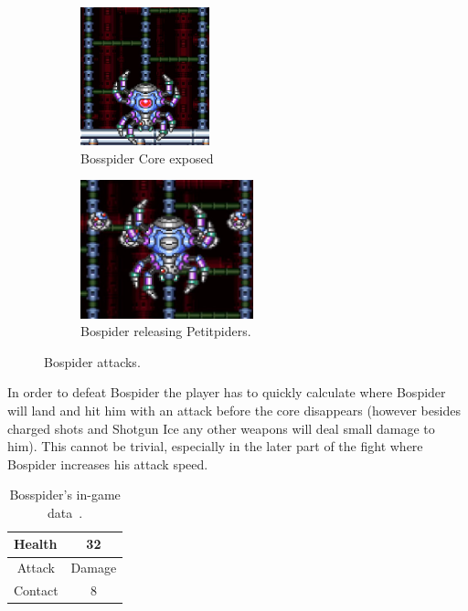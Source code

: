 \begin{figure}[htp]
	\centering
	\begin{subfigure}[t]{0.40\linewidth}
		\centering
		\includegraphics[height=4cm]{figures/X1/Sigma_stages/Bospider_core.jpg}
		\caption{Bosspider Core exposed}
	\end{subfigure}
	\begin{subfigure}[t]{0.45\linewidth}
		\centering
		\includegraphics[height=4cm]{figures/X1/Sigma_stages/Bospider_summon.jpg}
		\caption{Bospider releasing Petitpiders.}
	\end{subfigure}
	\caption{Bospider attacks.}
\end{figure} 
In order to defeat Bospider the player has to quickly calculate where Bospider will land and hit him with an attack before the core disappears (however besides charged shots and Shotgun Ice any other weapons will deal small damage to him). This cannot be trivial, especially in the later part of the fight where Bospider increases his attack speed.


\begin{table}[htp]
	\centering
	\begin{tabular}[h]{l c}
		\toprule
		Health  & 32\\
		\midrule
		\multicolumn{1}{c}{Attack} & \multicolumn{1}{c}{Damage}\\
		Contact & 8\\
		\bottomrule
	\end{tabular}
	\caption{Bosspider's in-game data~\cite{wiki:Bospider}. }
\end{table}


